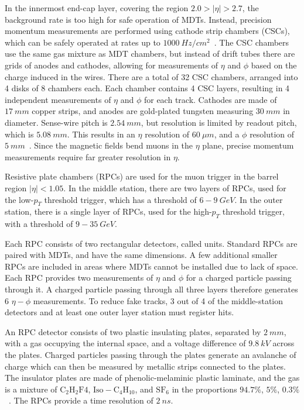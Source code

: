 In the innermost end-cap layer, covering the region $2.0 > |\eta| > 2.7$, the background rate is too high for safe operation of MDTs.
Instead, precision momentum measurements are performed using cathode strip chambers (CSCs), which can be safely operated at rates up to $1000~Hz/cm^2$~\cite{atlas-detector-2008}.
The CSC chambers use the same gas mixture as MDT chambers, but instead of drift tubes there are grids of anodes and cathodes, allowing for measurements of $\eta$ and $\phi$ based on the charge induced in the wires.
There are a total of 32 CSC chambers, arranged into 4 disks of 8 chambers each.
Each chamber contains 4 CSC layers, resulting in 4 independent measurements of $\eta$ and $\phi$ for each track.
Cathodes are made of $17~mm$ copper strips, and anodes are gold-plated tungsten measuring $30~mm$ in diameter.
Sense-wire pitch is $2.54~mm$, but resolution is limited by readout pitch, which is $5.08~mm$.
This results in an $\eta$ resolution of $60~\mu m$, and a $\phi$ resolution of $5~mm$~\cite{muon-2003}.
Since the magnetic fields bend muons in the $\eta$ plane, precise momentum measurements require far greater resolution in $\eta$.

Resistive plate chambers (RPCs) are used for the muon trigger in the barrel region $|\eta| < 1.05$.
In the middle station, there are two layers of RPCs, used for the low-$p_T$ threshold trigger, which has a threshold of $6-9~GeV$.
In the outer station, there is a single layer of RPCs, used for the high-$p_T$ threshold trigger, with a threshold of $9-35~GeV$.

Each RPC consists of two rectangular detectors, called units.
Standard RPCs are paired with MDTs, and have the same dimensions.
A few additional smaller RPCs are included in areas where MDTs cannot be installed due to lack of space.
Each RPC provides two measurements of $\eta$ and $\phi$ for a charged particle passing through it.
A charged particle passing through all three layers therefore generates 6 $\eta-\phi$ measurements.
To reduce fake tracks, 3 out of 4 of the middle-station detectors and at least one outer layer station must register hits.

An RPC detector consists of two plastic insulating plates, separated by $2~mm$, with a gas occupying the internal space, and a voltage difference of $9.8~kV$ across the plates.
Charged particles passing through the plates generate an avalanche of charge which can then be measured by metallic strips connected to the plates.
The insulator plates are made of phenolic-melaminic plastic laminate, and the gas is a mixture of $\mathrm{C_2 H_2 F4}$, $\mathrm{Iso-C_4 H_{10}}$, and $\mathrm{SF_6}$ in the proportions $94.7\%$, $5\%$, $0.3\%$~\cite{atlas-detector-2008}.
The RPCs provide a time resolution of $2~ns$.

